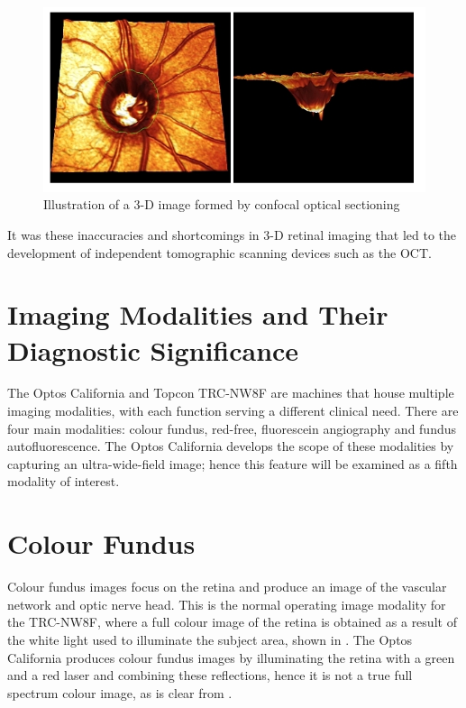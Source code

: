 \begin{figure}[htbp]
\centering
\includegraphics{figures/3dcslo}
\caption{Illustration of a 3-D image formed by confocal optical sectioning}
\label{fig:3d}
   \end{figure}

It was these inaccuracies and shortcomings in 3-D retinal imaging that
led to the development of independent tomographic scanning devices such as the OCT.


\section{Imaging Modalities and Their Diagnostic Significance}

The Optos California and Topcon TRC-NW8F are machines that house multiple
imaging modalities, with each function serving a different clinical need.
There are four main modalities: colour fundus, red-free, fluorescein angiography
and fundus autofluorescence. The Optos California develops the scope of these
modalities by capturing an ultra-wide-field image; hence this feature will be
examined as a fifth modality of interest.


\section{Colour Fundus}

Colour fundus images focus on the retina and produce an image of the vascular
network and optic nerve head. This is the normal operating image modality for
the TRC-NW8F, where a full colour image of the retina is obtained as a result
of the white light used to illuminate the subject area, shown in .
The Optos California produces colour fundus images by illuminating the retina
with a green and a red laser and combining these reflections, hence it is not
a true full spectrum colour image, as is clear from .


